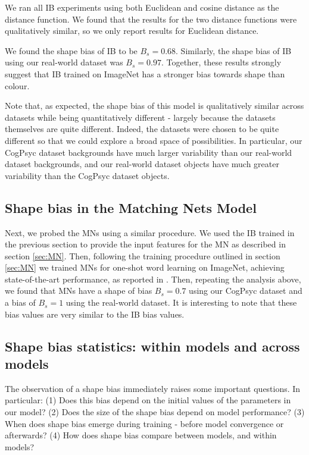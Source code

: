 \documentclass{article}
\begin{document}
We ran all IB experiments using both Euclidean and cosine distance as the distance function. We found that the results for the two distance functions were qualitatively similar, so we only report results for Euclidean distance.

We found the shape bias of IB to be $B_s = 0.68$. Similarly, the shape bias of IB using our real-world dataset was $B_s = 0.97$. Together, these results strongly suggest that IB trained on ImageNet has a stronger bias towards shape than colour. 

Note that, as expected, the shape bias of this model is qualitatively similar across datasets while being quantitatively different - largely because the datasets themselves are quite different. Indeed, the datasets were chosen to be quite different so that we could explore a broad space of possibilities. In particular, our CogPsyc dataset backgrounds have much larger variability than our real-world dataset backgrounds, and our real-world dataset objects have much greater variability than the CogPsyc dataset objects. 

\subsection{Shape bias in the Matching Nets Model}
Next, we probed the MNs using a similar procedure. We used the IB trained in the previous section to provide the input features for the MN as described in section \ref{sec:MN}. Then, following the training procedure outlined in section \ref{sec:MN} we trained MNs for one-shot word learning on ImageNet, achieving state-of-the-art performance, as reported in \citep{vinyals2016matching}. Then, repeating the analysis above, we found that MNs have a shape of bias $B_s = 0.7$ using our CogPsyc dataset and a bias of $B_s = 1$ using the real-world dataset. It is interesting to note that these bias values are very similar to the IB bias values.

\subsection{Shape bias statistics: within models and across models}

The observation of a shape bias immediately raises some important questions. In particular: (1) Does this bias depend on the initial values of the parameters in our model? (2) Does the size of the shape bias depend on model performance? (3) When does shape bias emerge during training - before model convergence or afterwards? (4) How does shape bias compare between models, and within models?
\end{document}
